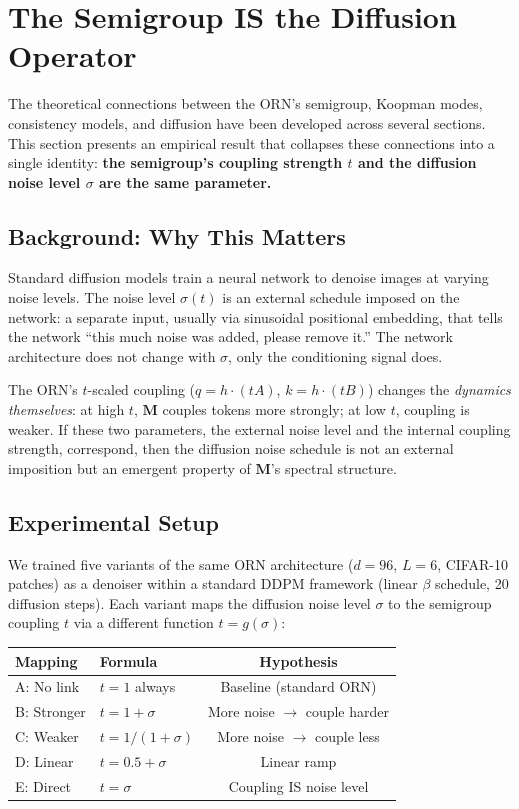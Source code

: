 \documentclass[11pt, a4paper]{article}
\newcommand{\M}{\mathbf{M}}
\theoremstyle{plain}
\theoremstyle{remark}
\begin{document}
\section{The Semigroup IS the Diffusion Operator}\label{sec:diffusion-identity}

The theoretical connections between the ORN's semigroup, Koopman modes, consistency models, and diffusion have been developed across several sections.
This section presents an empirical result that collapses these connections into a single identity: \textbf{the semigroup's coupling strength $t$ and the diffusion noise level $\sigma$ are the same parameter.}

\subsection{Background: Why This Matters}

Standard diffusion models train a neural network to denoise images at varying noise levels.
The noise level $\sigma(t)$ is an external schedule imposed on the network: a separate input, usually via sinusoidal positional embedding, that tells the network ``this much noise was added, please remove it.''
The network architecture does not change with $\sigma$, only the conditioning signal does.

The ORN's $t$-scaled coupling ($q = h \cdot (tA)$, $k = h \cdot (tB)$) changes the \emph{dynamics themselves}: at high $t$, $\M$ couples tokens more strongly; at low $t$, coupling is weaker.
If these two parameters, the external noise level and the internal coupling strength, correspond, then the diffusion noise schedule is not an external imposition but an emergent property of $\M$'s spectral structure.

\subsection{Experimental Setup}

We trained five variants of the same ORN architecture ($d{=}96$, $L{=}6$, CIFAR-10 patches) as a denoiser within a standard DDPM framework (linear $\beta$ schedule, 20 diffusion steps).
Each variant maps the diffusion noise level $\sigma$ to the semigroup coupling $t$ via a different function $t = g(\sigma)$:

\begin{center}\small
\begin{tabular}{@{}llc@{}}
\toprule
\textbf{Mapping} & \textbf{Formula} & \textbf{Hypothesis} \\
\midrule
A: No link & $t = 1$ always & Baseline (standard ORN) \\
B: Stronger & $t = 1 + \sigma$ & More noise $\to$ couple harder \\
C: Weaker & $t = 1/(1+\sigma)$ & More noise $\to$ couple less \\
D: Linear & $t = 0.5 + \sigma$ & Linear ramp \\
E: Direct & $t = \sigma$ & Coupling IS noise level \\
\bottomrule
\end{tabular}
\end{center}
\end{document}
